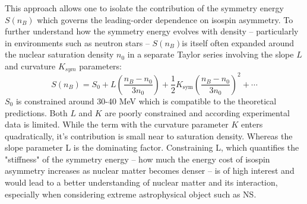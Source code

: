 This approach allows one to isolate the contribution of the symmetry energy $S(n_B)$  which governs the leading-order dependence on isospin asymmetry.\newline
To further understand how the symmetry energy evolves with density -- particularly in environments such as neutron stars -- $S(n_B) $is itself often expanded around the nuclear saturation density $n_0$ in a separate Taylor series involving the slope $L$ and curvature $K_{sym}$ parameters:
\begin{equation}
S(n_B) = S_0 + L \left( \frac{n_B - n_0}{3n_0} \right) + \frac{1}{2} K_{\text{sym}} \left( \frac{n_B - n_0}{3n_0} \right)^2 + \cdots
\end{equation}
$S_0$ is constrained around 30-40 MeV which is compatible to the theoretical predictions. Both $L$ and $K$ are poorly constrained and according experimental data is limited. While the term with the curvature parameter $K$ enters quadratically, it’s contribution is small near to saturation density.\newline
Whereas the slope parameter L is the dominating factor. Constraining L, which quantifies the "stiffness" of the symmetry energy -- how much the energy cost of isospin asymmetry increases as nuclear matter becomes denser -- is of high interest and would lead to a better understanding of nuclear matter and its interaction, especially when considering extreme astrophysical object such as NS. 






